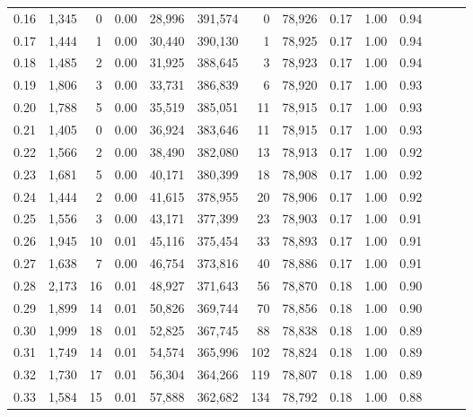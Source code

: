\begin{tabular}{rrrrrrrrrrrrrr}
0.16 &   1,345 &      0 &  0.00 &   28,996 &  391,574 &       0 &  78,926 &  0.17 &  1.00 &      0.94 \\
0.17 &   1,444 &      1 &  0.00 &   30,440 &  390,130 &       1 &  78,925 &  0.17 &  1.00 &      0.94 \\
0.18 &   1,485 &      2 &  0.00 &   31,925 &  388,645 &       3 &  78,923 &  0.17 &  1.00 &      0.94 \\
0.19 &   1,806 &      3 &  0.00 &   33,731 &  386,839 &       6 &  78,920 &  0.17 &  1.00 &      0.93 \\
0.20 &   1,788 &      5 &  0.00 &   35,519 &  385,051 &      11 &  78,915 &  0.17 &  1.00 &      0.93 \\
0.21 &   1,405 &      0 &  0.00 &   36,924 &  383,646 &      11 &  78,915 &  0.17 &  1.00 &      0.93 \\
0.22 &   1,566 &      2 &  0.00 &   38,490 &  382,080 &      13 &  78,913 &  0.17 &  1.00 &      0.92 \\
0.23 &   1,681 &      5 &  0.00 &   40,171 &  380,399 &      18 &  78,908 &  0.17 &  1.00 &      0.92 \\
0.24 &   1,444 &      2 &  0.00 &   41,615 &  378,955 &      20 &  78,906 &  0.17 &  1.00 &      0.92 \\
0.25 &   1,556 &      3 &  0.00 &   43,171 &  377,399 &      23 &  78,903 &  0.17 &  1.00 &      0.91 \\
0.26 &   1,945 &     10 &  0.01 &   45,116 &  375,454 &      33 &  78,893 &  0.17 &  1.00 &      0.91 \\
0.27 &   1,638 &      7 &  0.00 &   46,754 &  373,816 &      40 &  78,886 &  0.17 &  1.00 &      0.91 \\
0.28 &   2,173 &     16 &  0.01 &   48,927 &  371,643 &      56 &  78,870 &  0.18 &  1.00 &      0.90 \\
0.29 &   1,899 &     14 &  0.01 &   50,826 &  369,744 &      70 &  78,856 &  0.18 &  1.00 &      0.90 \\
0.30 &   1,999 &     18 &  0.01 &   52,825 &  367,745 &      88 &  78,838 &  0.18 &  1.00 &      0.89 \\
0.31 &   1,749 &     14 &  0.01 &   54,574 &  365,996 &     102 &  78,824 &  0.18 &  1.00 &      0.89 \\
0.32 &   1,730 &     17 &  0.01 &   56,304 &  364,266 &     119 &  78,807 &  0.18 &  1.00 &      0.89 \\
0.33 &   1,584 &     15 &  0.01 &   57,888 &  362,682 &     134 &  78,792 &  0.18 &  1.00 &      0.88 \\

\end{tabular}
